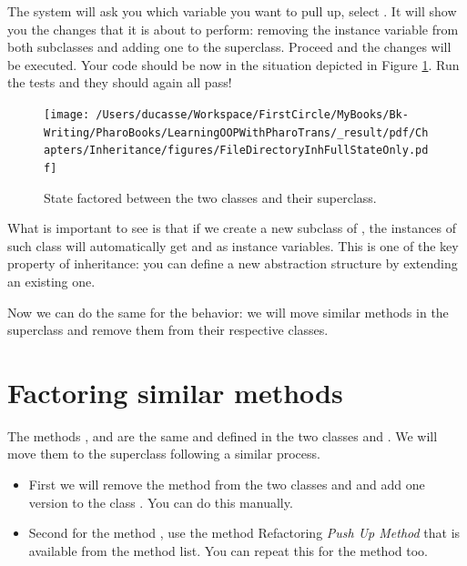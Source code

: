 \documentclass[10pt,twoside,english]{_support/latex/sbabook/sbabook}
\begin{document}
The system will ask you which variable you want to pull up, select . It will show you the changes that it is about to perform: removing the instance variable from both subclasses and adding one to the superclass. Proceed and the changes will be executed. Your
code should be now in the situation depicted in Figure \ref{FileDirectoryInhFullStateOnly}.
Run the tests and they should again all pass!


\begin{figure}

\begin{center}
\texttt{[image: /Users/ducasse/Workspace/FirstCircle/MyBooks/Bk-Writing/PharoBooks/LearningOOPWithPharoTrans/\_result/pdf/Chapters/Inheritance/figures/FileDirectoryInhFullStateOnly.pdf]}\caption{State factored between the two classes and their superclass.\label{FileDirectoryInhFullStateOnly}}\end{center}
\end{figure}


What is important to see is that if we create a new subclass of , the instances of such class will automatically get  and  as instance variables. This is one of the key property of inheritance: you can define a new abstraction structure by extending an existing one. 

Now we can do the same for the behavior: we will move similar methods in the superclass and remove them from their respective classes. 
\section{Factoring similar methods}
The methods ,  and  are the same and defined in the two classes  and . We will move them to the superclass  following a similar process.

\begin{itemize}
\item First we will remove the method  from the two classes  and  and add one version to the class . You can do this manually. 
\end{itemize}

\begin{itemize}
\item Second for the method , use the method Refactoring \textit{Push Up Method} that is available from the method list.  You can repeat this for the method  too. 
\end{itemize}
\end{document}
